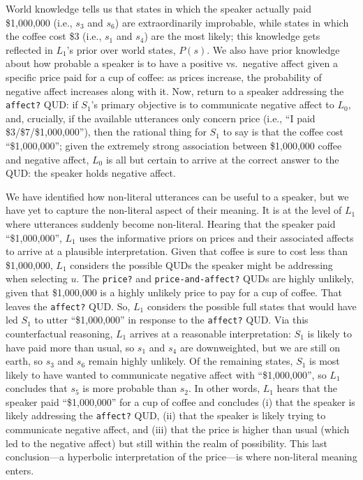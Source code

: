 \documentclass[10pt,letterpaper]{article}
\begin{document}
World knowledge tells us that states in which the speaker actually paid \$1,000,000 (i.e., $s_3$ and $s_6$) are extraordinarily improbable, while states in which the coffee cost \$3 (i.e., $s_1$ and $s_4$) are the most likely; this knowledge gets reflected in $L_1$'s prior over world states, $P(s)$. We also have prior knowledge about how probable a speaker is to have a positive vs.~negative affect given a specific price paid for a cup of coffee: as prices increase, the probability of negative affect increases along with it. Now, return to a speaker addressing the \texttt{affect?} QUD: if $S_1$'s primary objective is to communicate negative affect to $L_0$, and, crucially, if the available utterances only concern price (i.e., ``I paid \$3/\$7/\$1,000,000''), then the rational thing for $S_1$ to say is that the coffee cost ``\$1,000,000''; given the extremely strong association between \$1,000,000 coffee and negative affect, $L_0$ is all but certain to arrive at the correct answer to the QUD: the speaker holds negative affect.

We have identified how non-literal utterances can be useful to a speaker, but we have yet to capture the non-literal aspect of their meaning. It is at the level of $L_1$ where utterances suddenly become non-literal. Hearing that the speaker paid ``\$1,000,000'', $L_1$ uses the informative priors on prices and their associated affects to arrive at a plausible interpretation. Given that coffee is sure to cost less than \$1,000,000, $L_1$ considers the possible QUDs the speaker might be addressing when selecting $u$. The \texttt{price?} and \texttt{price-and-affect?} QUDs are highly unlikely, given that \$1,000,000 is a highly unlikely price to pay for a cup of coffee. That leaves the \texttt{affect?} QUD. So, $L_1$ considers the possible full states that would have led $S_1$ to utter ``\$1,000,000'' in response to the \texttt{affect?} QUD. Via this counterfactual reasoning, $L_1$ arrives at a reasonable interpretation: $S_1$ is likely to have paid more than usual, so $s_1$ and $s_4$ are downweighted, but we are still on earth, so $s_3$ and $s_6$ remain highly unlikely. Of the remaining states, $S_1$ is most likely to have wanted to communicate negative affect with ``\$1,000,000'', so $L_1$ concludes that $s_5$ is more probable than $s_2$. In other words, $L_1$ hears that the speaker paid ``\$1,000,000'' for a cup of coffee and concludes (i) that the speaker is likely addressing the \texttt{affect?} QUD, (ii) that the speaker is likely trying to communicate negative affect, and (iii) that the price is higher than usual (which led to the negative affect) but still within the realm of possibility. This last conclusion---a hyperbolic interpretation of the price---is where non-literal meaning enters.
\end{document}
